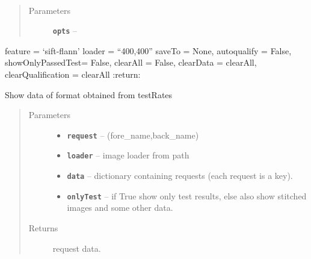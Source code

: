 \documentclass[letterpaper,10pt,english]{sphinxmanual}
\begin{document}

\begin{fulllineitems}
\label{RRtoolbox.tools:RRtoolbox.tools.restoration.testRates}~\begin{quote}\begin{description}
\item[{Parameters}] \leavevmode
\textbf{\texttt{opts}} -- 

\end{description}\end{quote}

feature = `sift-flann'
loader = ``400,400''
saveTo = None,
autoqualify = False,
showOnlyPassedTest= False,
clearAll = False,
clearData = clearAll,
clearQualification = clearAll
:return:

\end{fulllineitems}


\begin{fulllineitems}
\label{RRtoolbox.tools:RRtoolbox.tools.restoration.watchData}
Show data of format obtained from testRates
\begin{quote}\begin{description}
\item[{Parameters}] \leavevmode\begin{itemize}
\item {} 
\textbf{\texttt{request}} -- (fore\_name,back\_name)

\item {} 
\textbf{\texttt{loader}} -- image loader from path

\item {} 
\textbf{\texttt{data}} -- dictionary containing requests (each request is a key).

\item {} 
\textbf{\texttt{onlyTest}} -- if True show only test results, else also show stitched images and some other data.

\end{itemize}

\item[{Returns}] \leavevmode
request data.

\end{description}\end{quote}

\end{fulllineitems}
\end{document}
